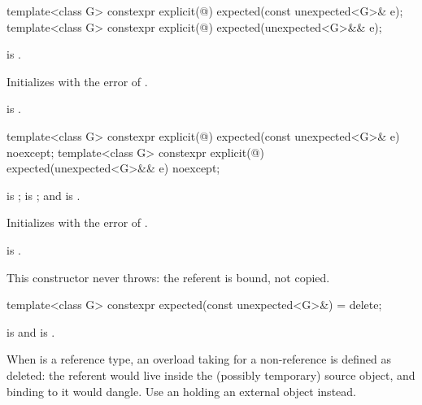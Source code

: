 %
\begin{itemdecl}
template<class G>
  constexpr explicit(@\seebelow@) expected(const unexpected<G>& e);
template<class G>
  constexpr explicit(@\seebelow@) expected(unexpected<G>&& e);
\end{itemdecl}

\begin{itemdescr}
\pnum
\constraints
{} is .

\pnum
\effects
Initializes  with the error of .

\pnum
\ensures
{} is .
\end{itemdescr}

%
\begin{itemdecl}
template<class G>
  constexpr explicit(@\seebelow@) expected(const unexpected<G>& e) noexcept;
template<class G>
  constexpr explicit(@\seebelow@) expected(unexpected<G>&& e) noexcept;
\end{itemdecl}

\begin{itemdescr}
\pnum
\constraints
{} is ;  is ; and  is .

\pnum
\effects
Initializes  with the error of .

\pnum
\ensures
{} is .

\pnum
\remarks
This constructor never throws: the referent is bound, not copied.
\end{itemdescr}

%
\begin{itemdecl}
template<class G>
  constexpr expected(const unexpected<G>&) = delete;
\end{itemdecl}

\begin{itemdescr}
\pnum
\constraints
{} is  and  is .

\pnum
\remarks
When  is a reference type, an overload taking  for a non-reference  is defined as deleted: the referent would live inside the (possibly temporary) source  object, and binding  to it would dangle. Use an  holding an external object instead.
\end{itemdescr}

